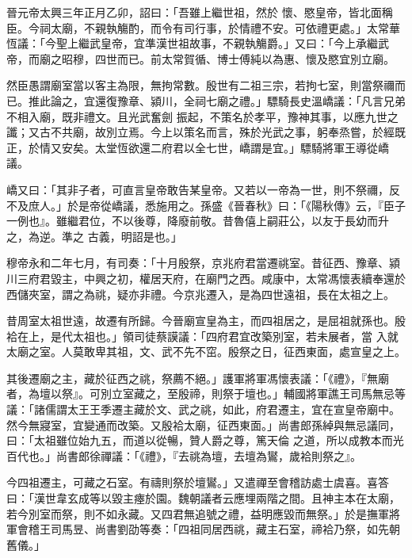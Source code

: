 \begin{pinyinscope}
 晉元帝太興三年正月乙卯，詔曰：「吾雖上繼世祖，然於
 懷、愍皇帝，皆北面稱臣。今祠太廟，不親執觴酌，而令有司行事，於情禮不安。可依禮更處。」太常華恆議：「今聖上繼武皇帝，宜準漢世祖故事，不親執觴爵。」又曰：「今上承繼武帝，而廟之昭穆，四世而已。前太常賀循、博士傅純以為惠、懷及愍宜別立廟。



 然臣愚謂廟室當以客主為限，無拘常數。殷世有二祖三宗，若拘七室，則當祭禰而已。推此論之，宜還復豫章、潁川，全祠七廟之禮。」驃騎長史溫嶠議：「凡言兄弟不相入廟，既非禮文。且光武奮劍
 振起，不策名於孝平，豫神其事，以應九世之讖；又古不共廟，故別立焉。今上以策名而言，殊於光武之事，躬奉烝嘗，於經既正，於情又安矣。太堂恆欲還二府君以全七世，嶠謂是宜。」驃騎將軍王導從嶠議。



 嶠又曰：「其非子者，可直言皇帝敢告某皇帝。又若以一帝為一世，則不祭禰，反不及庶人。」於是帝從嶠議，悉施用之。孫盛《晉春秋》曰：「《陽秋傳》云，『臣子一例也』。雖繼君位，不以後尊，降廢前敬。昔魯僖上嗣莊公，以友于長幼而升之，為逆。準之
 古義，明詔是也。」



 穆帝永和二年七月，有司奏：「十月殷祭，京兆府君當遷祧室。昔征西、豫章、潁川三府君毀主，中興之初，權居天府，在廟門之西。咸康中，太常馮懷表續奉還於西儲夾室，謂之為祧，疑亦非禮。今京兆遷入，是為四世遠祖，長在太祖之上。



 昔周室太祖世遠，故遷有所歸。今晉廟宣皇為主，而四祖居之，是屈祖就孫也。殷袷在上，是代太祖也。」領司徒蔡謨議：「四府君宜改築別室，若未展者，當
 入就太廟之室。人莫敢卑其祖，文、武不先不窋。殷祭之日，征西東面，處宣皇之上。



 其後遷廟之主，藏於征西之祧，祭薦不絕。」護軍將軍馮懷表議：「《禮》，『無廟者，為壇以祭』。可別立室藏之，至殷禘，則祭于壇也。」輔國將軍譙王司馬無忌等議：「諸儒謂太王王季遷主藏於文、武之祧，如此，府君遷主，宜在宣皇帝廟中。然今無寢室，宜變通而改築。又殷袷太廟，征西東面。」尚書郎孫綽與無忌議同，曰：「太祖雖位始九五，而道以從暢，贊人爵之尊，篤天倫
 之道，所以成教本而光百代也。」尚書郎徐禪議：「《禮》，『去祧為壇，去壇為鸑，歲袷則祭之』。



 今四祖遷主，可藏之石室。有禱則祭於壇鸑。」又遣禪至會稽訪處士虞喜。喜答曰：「漢世韋玄成等以毀主瘞於園。魏朝議者云應埋兩階之間。且神主本在太廟，若今別室而祭，則不如永藏。又四君無追號之禮，益明應毀而無祭。」於是撫軍將軍會稽王司馬昱、尚書劉劭等奏：「四祖同居西祧，藏主石室，禘袷乃祭，如先朝舊儀。」




\end{pinyinscope}
